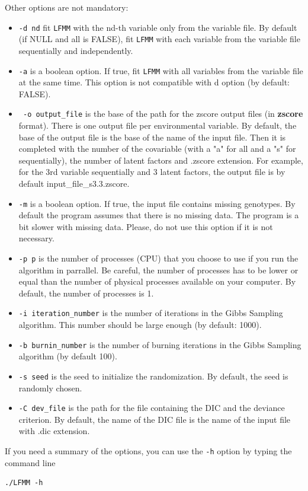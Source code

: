 \documentclass[10pt,a4paper]{article}
\begin{document}
\noindent
Other options are not mandatory:
\begin{itemize}
\item \verb|-d nd| fit {\tt LFMM} with the nd-th variable only from the variable file. By default (if NULL and all is FALSE), fit {\tt LFMM} with each variable from the variable file sequentially and independently.
\item \verb|-a| is a boolean option. If true, fit {\tt LFMM} with all variables from the variable file at the same time. This option is not compatible with d option (by default: FALSE).
\item \verb| -o output_file| is the base of the path for the zscore output files (in {\bf zscore} format). There is one output file per environmental variable. By default, the base of the output file is the base of the name of the input file. Then it is completed with the number of the covariable (with a "a" for all and a "s" for sequentially), the number of latent factors and .zscore extension. For example, for the 3rd variable sequentially and 3 latent factors, the output file is by default input\_file\_s3.3.zscore.
\item \verb|-m| is a boolean option. If true, the input file contains missing genotypes. By default the program assumes that there is no missing data. The program is a bit slower with missing data. Please, do not use this option if it is not necessary.
\item \verb|-p p| is the number of processes (CPU) that you choose to use if you run the algorithm in 
parrallel. Be careful, the number of processes has to be lower or equal than the number of physical 
processes available on your computer. By default, the number of processes is 1.
\item \verb|-i iteration_number| is the number of iterations in the Gibbs Sampling algorithm. This number
should be large enough (by default: 1000).
\item \verb|-b burnin_number| is the number of burning iterations in the Gibbs Sampling algorithm (by default 100). 
\item \verb|-s seed| is the seed to initialize the randomization. By default, the seed is randomly chosen.
\item \verb|-C dev_file| is the path for the file containing the DIC and the deviance criterion. By default, the name of the DIC file is the name of the input file with .dic extension. 
\end{itemize}

\noindent
If you need a summary of the options, you can use the \verb|-h| option by typing the command line
\footnotesize
\begin{Verbatim}[frame=single]
./LFMM -h
\end{Verbatim}
\noindent
\normalsize
\end{document}
